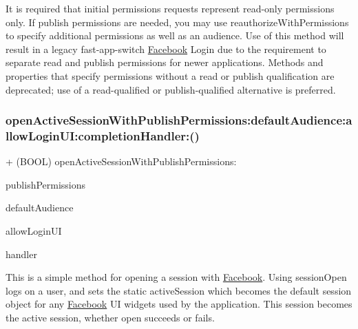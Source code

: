 It is required that initial permissions requests represent read-\/only permissions only. If publish permissions are needed, you may use reauthorize\+With\+Permissions to specify additional permissions as well as an audience. Use of this method will result in a legacy fast-\/app-\/switch \hyperlink{interfaceFacebook}{Facebook} Login due to the requirement to separate read and publish permissions for newer applications. Methods and properties that specify permissions without a read or publish qualification are deprecated; use of a read-\/qualified or publish-\/qualified alternative is preferred. \mbox{\label{interfaceFBSession_a727a1541ad09287fb613a018e100534d}} 
\subsubsection{\texorpdfstring{open\+Active\+Session\+With\+Publish\+Permissions\+:default\+Audience\+:allow\+Login\+U\+I\+:completion\+Handler\+:()}{openActiveSessionWithPublishPermissions:defaultAudience:allowLoginUI:completionHandler:()}\hspace{0.1cm}{\footnotesize\ttfamily [1/5]}}
{\footnotesize\ttfamily + (B\+O\+OL) open\+Active\+Session\+With\+Publish\+Permissions\+: \begin{DoxyParamCaption}\item[{(N\+S\+Array $\ast$)}]{publish\+Permissions }\item[{defaultAudience:(F\+B\+Session\+Default\+Audience)}]{default\+Audience }\item[{allowLoginUI:(B\+O\+OL)}]{allow\+Login\+UI }\item[{completionHandler:(F\+B\+Session\+State\+Handler)}]{handler }\end{DoxyParamCaption}}

This is a simple method for opening a session with \hyperlink{interfaceFacebook}{Facebook}. Using session\+Open logs on a user, and sets the static active\+Session which becomes the default session object for any \hyperlink{interfaceFacebook}{Facebook} UI widgets used by the application. This session becomes the active session, whether open succeeds or fails.


